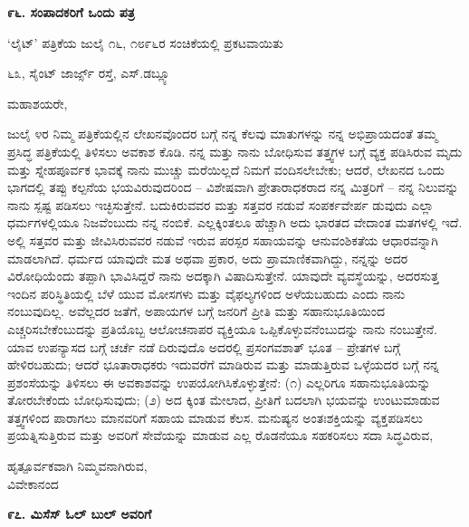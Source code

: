 \begin{center}
\textbf{೯೬. ಸಂಪಾದಕರಿಗೆ ಒಂದು ಪತ್ರ}
\end{center}

\begin{center}
‘ಲೈಟ್’ ಪತ್ರಿಕೆಯ ಜುಲೈ ೧೬, ೧೮೯೬ರ ಸಂಚಿಕೆಯಲ್ಲಿ ಪ್ರಕಟವಾಯಿತು
\end{center}

\begin{flushright}
೬೩, ಸೈಂಟ್ ಜಾರ್ಜ್ಸ್ ರಸ್ತೆ, ಎಸ್.ಡಬ್ಲ್ಯೂ
\end{flushright}

ಮಹಾಶಯರೇ,

ಜುಲೈ ೪ರ ನಿಮ್ಮ ಪತ್ರಿಕೆಯಲ್ಲಿನ ಲೇಖನವೊಂದರ ಬಗ್ಗೆ ನನ್ನ ಕೆಲವು ಮಾತುಗಳನ್ನು ನನ್ನ ಅಭಿಪ್ರಾಯದಂತೆ ತಮ್ಮ ಪ್ರಸಿದ್ಧ ಪತ್ರಿಕೆಯಲ್ಲಿ ತಿಳಿಸಲು ಅವಕಾಶ ಕೊಡಿ. ನನ್ನ ಮತ್ತು ನಾನು ಬೋಧಿಸುವ ತತ್ತ್ವಗಳ ಬಗ್ಗೆ ವ್ಯಕ್ತ ಪಡಿಸಿರುವ ಮೃದು ಮತ್ತು ಸ್ನೇಹಪೂರ್ವಕ ಭಾವಕ್ಕೆ ನಾನು ಮುಚ್ಚು ಮರೆಯಿಲ್ಲದೆ ನಿಮಗೆ ವಂದಿಸಲೇಬೇಕು; ಆದರೆ, ಲೇಖನದ ಒಂದು ಭಾಗದಲ್ಲಿ ತಪ್ಪು ಕಲ್ಪನೆಯ ಭಯವಿರುವುದರಿಂದ – ವಿಶೇಷವಾಗಿ ಪ್ರೇತಾರಾಧಕರಾದ ನನ್ನ ಮಿತ್ರರಿಗೆ – ನನ್ನ ನಿಲುವನ್ನು ನಾನು ಸ್ಪಷ್ಟ ಪಡಿಸಲು ಇಚ್ಛಿಸುತ್ತೇನೆ. ಬದುಕಿರುವವರ ಮತ್ತು ಸತ್ತವರ ನಡುವೆ ಸಂಪರ್ಕವೇರ್ಪ ಡುವುದು ಎಲ್ಲಾ ಧರ್ಮಗಳಲ್ಲಿಯೂ ನಿಜವೆಂಬುದು ನನ್ನ ನಂಬಿಕೆ. ಎಲ್ಲಕ್ಕಿಂತಲೂ ಹೆಚ್ಚಾಗಿ ಅದು ಭಾರತದ ವೇದಾಂತ ಮತಗಳಲ್ಲಿ ಇದೆ. ಅಲ್ಲಿ ಸತ್ತವರ ಮತ್ತು ಜೀವಿಸಿರುವವರ ನಡುವೆ ಇರುವ ಪರಸ್ಪರ ಸಹಾಯವನ್ನು ಆನುವಂಶಿಕತೆಯ ಆಧಾರವನ್ನಾಗಿ ಮಾಡಲಾಗಿದೆ. ಧರ್ಮದ ಯಾವುದೇ ಮತ ಅಥವಾ ಪ್ರಕಾರ, ಅದು ಪ್ರಾಮಾಣಿಕವಾಗಿದ್ದು, ನನ್ನನ್ನು ಅದರ ವಿರೋಧಿಯೆಂದು ತಪ್ಪಾಗಿ ಭಾವಿಸಿದ್ದರೆ ನಾನು ಅದಕ್ಕಾಗಿ ವಿಷಾದಿಸುತ್ತೇನೆ. ಯಾವುದೇ ವ್ಯವಸ್ಥೆಯನ್ನು, ಅದರಸುತ್ತ ಇಂದಿನ ಪರಿಸ್ಥಿತಿಯಲ್ಲಿ ಬೆಳೆ ಯುವ ಮೋಸಗಳು ಮತ್ತು ವೈಫಲ್ಯಗಳಿಂದ ಅಳೆಯಬಹುದು ಎಂದು ನಾನು ನಂಬುವುದಿಲ್ಲ. ಅವೆಲ್ಲದರ ಜತೆಗೆ, ಅಪಾಯಗಳ ಬಗ್ಗೆ ಜನರಿಗೆ ಪ್ರೀತಿ ಮತ್ತು ಸಹಾನುಭೂತಿಯಿಂದ ಎಚ್ಚರಿಸಬೇಕೆಂಬುದನ್ನು ಪ್ರತಿಯೊಬ್ಬ ಆಲೋಚನಾಪರ ವ್ಯಕ್ತಿಯೂ ಒಪ್ಪಿಕೊಳ್ಳುವನೆಂಬುದನ್ನು ನಾನು ನಂಬುತ್ತೇನೆ. ಯಾವ ಉಪನ್ಯಾಸದ ಬಗ್ಗೆ ಚರ್ಚೆ ನಡೆ ದಿರುವುದೊ ಅದರಲ್ಲಿ ಪ್ರಸಂಗವಶಾತ್ ಭೂತ – ಪ್ರೇತಗಳ ಬಗ್ಗೆ ಹೇಳಿರಬಹುದು; ಆದರೆ ಭೂತಾರಾಧಕರು ಇದುವರೆಗೆ ಮಾಡಿರುವ ಮತ್ತು ಮಾಡುತ್ತಿರುವ ಒಳ್ಳೆಯದರ ಬಗ್ಗೆ ನನ್ನ ಪ್ರಶಂಸೆಯನ್ನು ತಿಳಿಸಲು ಈ ಅವಕಾಶವನ್ನು ಉಪಯೋಗಿಸಿಕೊಳ್ಳುತ್ತೇನೆ: (೧) ಎಲ್ಲರಿಗೂ ಸಹಾನುಭೂತಿಯನ್ನು ತೋರಬೇಕೆಂದು ಬೋಧಿಸುವುದು; (೨) ಅದ ಕ್ಕಿಂತ ಮೇಲಾದ, ಪ್ರೀತಿಗೆ ಬದಲಾಗಿ ಭಯವನ್ನು ಉಂಟುಮಾಡುವ ತತ್ತ್ವಗಳಿಂದ ಪಾರಾಗಲು ಮಾನವರಿಗೆ ಸಹಾಯ ಮಾಡುವ ಕೆಲಸ. ಮನುಷ್ಯನ ಅಂತಃಶಕ್ತಿಯನ್ನು ವ್ಯಕ್ತಪಡಿಸಲು ಪ್ರಯತ್ನಿಸುತ್ತಿರುವ ಮತ್ತು ಅವರಿಗೆ ಸೇವೆಯನ್ನು ಮಾಡುವ ಎಲ್ಲ ರೊಡನೆಯೂ ಸಹಕರಿಸಲು ಸದಾ ಸಿದ್ಧವಿರುವ,

\begin{flushright}
ಹೃತ್ಪೂರ್ವಕವಾಗಿ ನಿಮ್ಮವನಾಗಿರುವ,\\ವಿವೇಕಾನಂದ
\end{flushright}

\begin{center}
\textbf{೯೭. ಮಿಸೆಸ್ ಓಲ್ ಬುಲ್ ಅವರಿಗೆ}
\end{center}


